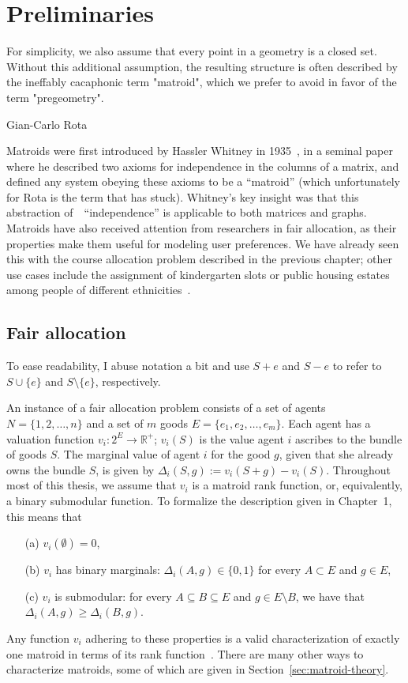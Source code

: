 \chapter{Preliminaries}
\label{chap:prelims}
\epigraph{For simplicity, we also assume that every point in a geometry is a closed set. Without this additional assumption, the resulting structure is often described by the ineffably cacaphonic term "matroid", which we prefer to avoid in favor of the term "pregeometry".}{Gian-Carlo Rota \cite{crapo_rota_1970}}

Matroids were first introduced by Hassler Whitney in 1935~\cite{whitney-1935}, in a seminal paper where he described two axioms for independence in the columns of a matrix, and defined any system obeying these axioms to be a ``matroid'' (which unfortunately for Rota is the term that has stuck). Whitney's key insight was that this abstraction of~~``independence'' is applicable to both matrices and graphs. Matroids have also received attention from researchers in fair allocation, as their properties make them useful for modeling user preferences. We have already seen this with the course allocation problem described in the previous chapter; other use cases include the assignment of kindergarten slots or public housing estates among people of different ethnicities~\cite{benabbou-2021}.

\section{Fair allocation}
To ease readability, I abuse notation a bit and use $S+e$ and $S-e$ to refer to $S \cup \{e\}$ and $S \setminus \{e\}$, respectively.

An instance of a fair allocation problem consists of a set of agents $N = \{1,2,\ldots, n\}$ and a set of $m$ goods $E = \{e_1, e_2, \dots, e_m\}$. Each agent has a valuation function $v_i: 2^E \to \mathbb{R}^+$; $v_i(S)$ is the value agent $i$ ascribes to the bundle of goods $S$. The marginal value of agent $i$ for the good $g$, given that she already owns the bundle $S$, is given by $\Delta_i(S, g) := v_i(S + g) - v_i(S)$. Throughout most of this thesis, we assume that $v_i$ is a matroid rank function, or, equivalently, a binary submodular function. To formalize the description given in Chapter~1, this means that
\begin{enumerate}
  \item[(a)] $v_i(\emptyset) = 0$,
  \item[(b)] $v_i$ has binary marginals: $\Delta_i(A, g)\in \{0,1\}$ for every $A \subset E$ and $g\in E$,
  \item[(c)] $v_i$ is submodular: for every $A\subseteq B\subseteq E$ and $g\in E\setminus B$, we have that $\Delta_i(A, g) \geq \Delta_i(B, g)$.
\end{enumerate}
Any function $v_i$ adhering to these properties is a valid characterization of exactly one matroid in terms of its rank function~\cite{schrijver-2003}. There are many other ways to characterize matroids, some of which are given in Section~\ref{sec:matroid-theory}.

